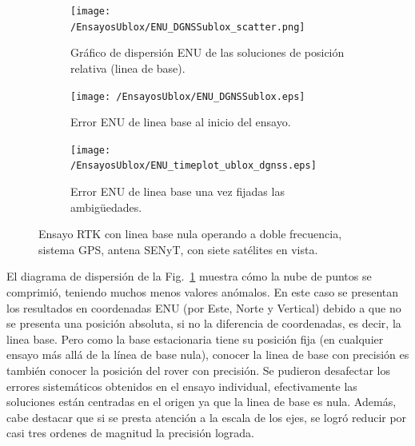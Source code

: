 \documentclass[a4paper,12pt,oneside,onecolumn,final,openright]{book}%
\begin{document}
\begin{figure}
\begin{subfigure}{1\linewidth}
\centering
  	\texttt{[image: /EnsayosUblox/ENU\_DGNSSublox\_scatter.png]}
  	\caption{Gráfico de dispersión ENU de las soluciones de posición relativa (linea de base).}
    \label{fig:scatter_ublox_DGNSS}
\end{subfigure}

\begin{subfigure}{0.49\linewidth}
\centering
 	\texttt{[image: /EnsayosUblox/ENU\_DGNSSublox.eps]}
 	\caption{Error ENU de linea base al inicio del ensayo.}
  	\label{fig:error_ublox_DGNSS_ini}
\end{subfigure}
\begin{subfigure}{0.49\linewidth}
\centering
 	\texttt{[image: /EnsayosUblox/ENU\_timeplot\_ublox\_dgnss.eps]}
 	\caption{Error ENU de linea base una vez fijadas las ambigüedades.}
  	\label{fig:error_ublox_DGNSS_fin}
\end{subfigure}
\caption{Ensayo RTK con linea base nula operando a doble frecuencia, sistema GPS, antena SENyT, con siete satélites en vista.}
\label{fig:ensayoDGNSS_ublox}
\end{figure}
	
	El diagrama de dispersión de la Fig.~\ref{fig:scatter_ublox_DGNSS} muestra cómo la nube de puntos se comprimió, teniendo muchos menos valores anómalos. En este caso se presentan los resultados en coordenadas ENU (por Este, Norte y Vertical) debido a que no se presenta una posición absoluta, si no la diferencia de coordenadas, es decir, la linea base. Pero como la base estacionaria tiene su posición fija (en cualquier ensayo más allá de la línea de base nula), conocer la linea de base con precisión es también conocer la posición del rover con precisión. Se pudieron desafectar los errores sistemáticos obtenidos en el ensayo individual, efectivamente las soluciones están centradas en el origen ya que la linea de base es nula. Además, cabe destacar que si se presta atención a la escala de los ejes, se logró reducir por casi tres ordenes de magnitud la precisión lograda. 
	
\end{document}
